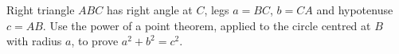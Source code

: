 Right triangle $ABC$ has right angle at $C$, legs $a=BC$, $b=CA$ and hypotenuse $c=AB$. Use the power of a point theorem, applied to the circle centred at $B$ with radius $a$, to prove $a^2+b^2=c^2$.
